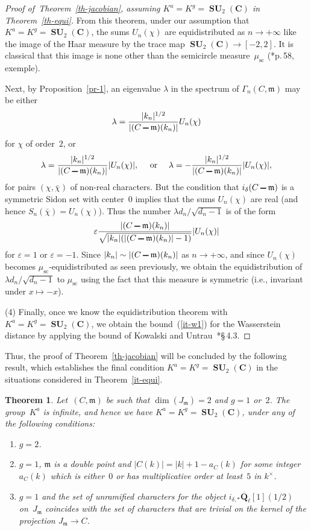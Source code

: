 \documentclass[12pt]{amsart}
\numberwithin{equation}{section}
\def\setminus{\mathchoice
    {\mathbin{\vrule height .62ex width 1.61ex depth -.38ex}}%
    {\mathbin{\vrule height .62ex width 1.61ex depth -.38ex}}%
    {\mathbin{\vrule height .50ex width 0.85ex depth -.28ex}}%
    {\mathbin{\vrule height .20ex width 0.570ex depth -.24ex}}%
}
\newcommand{\Cc}{\mathbf{C}}
\newcommand{\Qq}{\mathbf{Q}}
\newcommand{\bQl}{\overline{\Qq}_{\ell}}
\newcommand{\mfm}{\mathfrak{m}}
\newcommand{\eps}{\varepsilon}
\DeclareMathOperator{\SU}{\mathbf{SU}}
\theoremstyle{plain}
\newtheorem{theorem}{Theorem}[section]
\theoremstyle{remark}
\theoremstyle{definition}
\begin{document}
\begin{proof}[Proof of~Theorem~\ref{th-jacobian}, assuming
  $K^a=K^g=\SU_2(\Cc)$ in Theorem~\ref{th-equi}]
  From this theorem, under our assumption that $K^a=K^g=\SU_2(\Cc)$, the
  sums $U_n(\chi)$ are equidistributed as $n\to+\infty$ like the image
  of the Haar measure by the trace map $\SU_2(\Cc)\to [-2,2]$. It is
  classical that this image is none other than the semicircle measure~$\mu_{\mathrm{sc}}$ (\cite{bourbaki}*{p.\,58,\,exemple}).

  Next, by Proposition~\ref{pr-1}, an eigenvalue $\lambda$ in the
  spectrum of $\Gamma_n(C,\mfm)$ may be either
  \[
    \lambda=\frac{|k_n|^{1/2}}{|(C\setminus\mfm)(k_n)|}U_n(\chi)
  \]
  for $\chi$ of order~$2$, or
  \[
    \lambda=\frac{|k_n|^{1/2}}{|(C\setminus\mfm)(k_n)|}|U_n(\chi)|,\quad\text{
      or }\quad
    \lambda=-\frac{|k_n|^{1/2}}{|(C\setminus\mfm)(k_n)|}|U_n(\chi)|,
  \]
  for pairs $(\chi,\bar{\chi})$ of non-real characters. But the
  condition that $i_{\delta}(C\setminus \mfm)$ is a symmetric Sidon
  set with center~$0$ implies that the sums $U_n(\chi)$ are real (and
  hence $S_n(\bar{\chi})=U_n(\chi)$). Thus the number
  $\lambda d_n/\sqrt{d_n-1}$ is of the form
  \[
    \eps \frac{|(C\setminus\mfm)(k_n)|}
    {\sqrt{|k_n|(|(C\setminus\mfm)(k_n)|-1)}}
    |U_n(\chi)|
  \]
  for $\eps=1$ or $\eps=-1$. Since $|k_n|\sim |(C\setminus\mfm)(k_n)|$
  as $n\to +\infty$, and since $U_n(\chi)$ becomes
  $\mu_{\mathrm{sc}}$-equidistributed as seen previously, we obtain
  the equidistribution of $\lambda d_n/\sqrt{d_n-1}$ to
  $\mu_{\mathrm{sc}}$ using the fact that this measure is symmetric
  (i.e., invariant under $x\mapsto -x$).

  (4) Finally, once we know the equidistribution theorem with $K^a=K^g=\SU_2(\Cc)$, we obtain the bound~(\ref{it-w1}) for the
  Wasserstein distance by applying the bound of Kowalski and
  Untrau~\cite{k-u}*{\S\,4.3}.
\end{proof}

Thus, the proof of Theorem~\ref{th-jacobian} will be concluded by the
following result, which establishes the final condition
$K^a=K^g=\SU_2(\Cc)$ in the situations considered in
Theorem~\ref{it-equi}.

\begin{theorem}
  Let~$(C,\mfm)$ be such that $\dim(J_{\mfm})=2$ and $g=1$ or~$2$. The
  group~$K^a$ is infinite, and hence we have $K^a=K^g=\SU_2(\Cc)$, under any
  of the following conditions:
  \begin{enumerate}
  \item[\textup{(i)}] $g=2$.
  \item[\textup{(ii)}] $g=1$, $\mfm$ is a double point and
    $|C(k)|=|k|+1-a_C(k)$ for some integer~$a_C(k)$ which is either~$0$ or has
    multiplicative order at least~$5$ in $k^{\times}$.
  \item[\textup{(iii)}] $g=1$ and the set of unramified characters for
    the object $i_{\delta,*}\bQl[1](1/2)$ on~$J_{\mfm}$ coincides with the
    set of characters that are trivial on the kernel of the 
    projection $J_{\mfm}\to C$.
  \end{enumerate}
\end{theorem}
\end{document}
